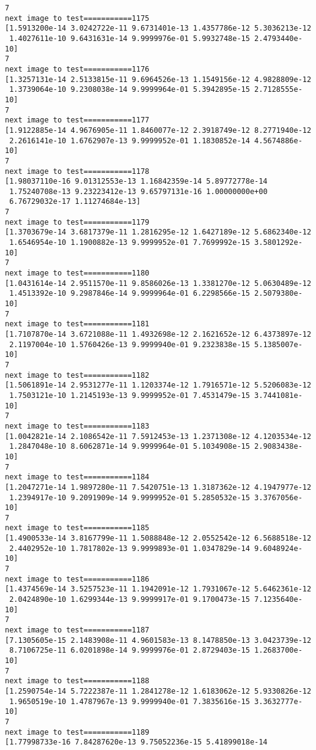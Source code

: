 \documentclass[11pt]{article}
\begin{document}
\begin{Verbatim}[commandchars=\\\{\}]
7
next image to test===========1175
[1.5913200e-14 3.0242722e-11 9.6731401e-13 1.4357786e-12 5.3036213e-12
 1.4027611e-10 9.6431631e-14 9.9999976e-01 5.9932748e-15 2.4793440e-10]
7
next image to test===========1176
[1.3257131e-14 2.5133815e-11 9.6964526e-13 1.1549156e-12 4.9828809e-12
 1.3739064e-10 9.2308038e-14 9.9999964e-01 5.3942895e-15 2.7128555e-10]
7
next image to test===========1177
[1.9122885e-14 4.9676905e-11 1.8460077e-12 2.3918749e-12 8.2771940e-12
 2.2616141e-10 1.6762907e-13 9.9999952e-01 1.1830852e-14 4.5674886e-10]
7
next image to test===========1178
[1.98037110e-16 9.01312553e-13 1.16842359e-14 5.89772778e-14
 1.75240708e-13 9.23223412e-13 9.65797131e-16 1.00000000e+00
 6.76729032e-17 1.11274684e-13]
7
next image to test===========1179
[1.3703679e-14 3.6817379e-11 1.2816295e-12 1.6427189e-12 5.6862340e-12
 1.6546954e-10 1.1900882e-13 9.9999952e-01 7.7699992e-15 3.5801292e-10]
7
next image to test===========1180
[1.0431614e-14 2.9511570e-11 9.8586026e-13 1.3381270e-12 5.0630489e-12
 1.4513392e-10 9.2987846e-14 9.9999964e-01 6.2298566e-15 2.5079380e-10]
7
next image to test===========1181
[1.7107870e-14 3.6721088e-11 1.4932698e-12 2.1621652e-12 6.4373897e-12
 2.1197004e-10 1.5760426e-13 9.9999940e-01 9.2323838e-15 5.1385007e-10]
7
next image to test===========1182
[1.5061891e-14 2.9531277e-11 1.1203374e-12 1.7916571e-12 5.5206083e-12
 1.7503121e-10 1.2145193e-13 9.9999952e-01 7.4531479e-15 3.7441081e-10]
7
next image to test===========1183
[1.0042821e-14 2.1086542e-11 7.5912453e-13 1.2371308e-12 4.1203534e-12
 1.2847048e-10 8.6062871e-14 9.9999964e-01 5.1034908e-15 2.9083438e-10]
7
next image to test===========1184
[1.2047271e-14 1.9897280e-11 7.5420751e-13 1.3187362e-12 4.1947977e-12
 1.2394917e-10 9.2091909e-14 9.9999952e-01 5.2850532e-15 3.3767056e-10]
7
next image to test===========1185
[1.4900533e-14 3.8167799e-11 1.5088848e-12 2.0552542e-12 6.5688518e-12
 2.4402952e-10 1.7817802e-13 9.9999893e-01 1.0347829e-14 9.6048924e-10]
7
next image to test===========1186
[1.4374569e-14 3.5257523e-11 1.1942091e-12 1.7931067e-12 5.6462361e-12
 2.0424890e-10 1.6299344e-13 9.9999917e-01 9.1700473e-15 7.1235640e-10]
7
next image to test===========1187
[7.1305605e-15 2.1483908e-11 4.9601583e-13 8.1478850e-13 3.0423739e-12
 8.7106725e-11 6.0201898e-14 9.9999976e-01 2.8729403e-15 1.2683700e-10]
7
next image to test===========1188
[1.2590754e-14 5.7222387e-11 1.2841278e-12 1.6183062e-12 5.9330826e-12
 1.9650519e-10 1.4787967e-13 9.9999940e-01 7.3835616e-15 3.3632777e-10]
7
next image to test===========1189
[1.77998733e-16 7.84287620e-13 9.75052236e-15 5.41899018e-14

\end{Verbatim}
\end{document}
